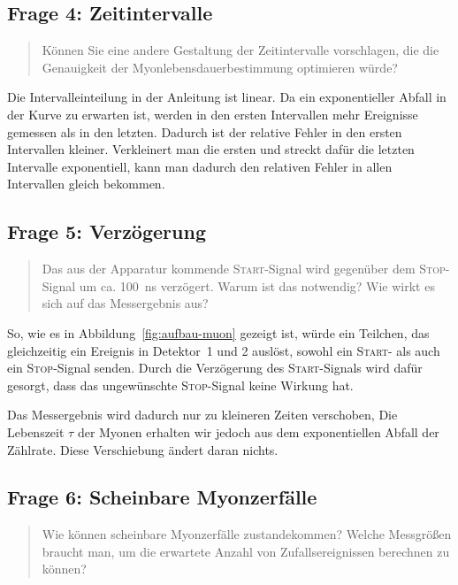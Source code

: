 \documentclass[11pt, ngerman, fleqn, DIV=15, headinclude, BCOR=2cm]{scrreprt}
\begin{document}
\subsection{Frage 4: Zeitintervalle}

\begin{quote}
    Können Sie eine andere Gestaltung der Zeitintervalle vorschlagen, die die
    Genauigkeit der Myonlebensdauerbestimmung optimieren würde?
\end{quote}

Die Intervalleinteilung in der Anleitung ist linear. Da ein exponentieller
Abfall in der Kurve zu erwarten ist, werden in den ersten Intervallen mehr
Ereignisse gemessen als in den letzten. Dadurch ist der relative Fehler in den
ersten Intervallen kleiner. Verkleinert man die ersten und streckt dafür die
letzten Intervalle exponentiell, kann man dadurch den relativen Fehler in allen
Intervallen gleich bekommen.

\subsection{Frage 5: Verzögerung}

\begin{quote}
    Das aus der Apparatur kommende \textsc{Start}-Signal wird gegenüber dem
    \textsc{Stop}-Signal um ca. \SI{100}{\nano\second} verzögert. Warum ist das
    notwendig? Wie wirkt es sich auf das Messergebnis aus?
\end{quote}

So, wie es in Abbildung~\ref{fig:aufbau-muon} gezeigt ist, würde ein Teilchen,
das gleichzeitig ein Ereignis in Detektor~1 und 2 auslöst, sowohl ein
\textsc{Start}- als auch ein \textsc{Stop}-Signal senden. Durch die Verzögerung
des \textsc{Start}-Signals wird dafür gesorgt, dass das ungewünschte
\textsc{Stop}-Signal keine Wirkung hat.

Das Messergebnis wird dadurch nur zu kleineren Zeiten verschoben, Die
Lebenszeit $\tau$ der Myonen erhalten wir jedoch aus dem exponentiellen Abfall
der Zählrate. Diese Verschiebung ändert daran nichts.

\subsection{Frage 6: Scheinbare Myonzerfälle}

\begin{quote}
    Wie können scheinbare Myonzerfälle zustandekommen? Welche Messgrößen
    braucht man, um die erwartete Anzahl von Zufallsereignissen berechnen zu
    können?
\end{quote}
\end{document}
